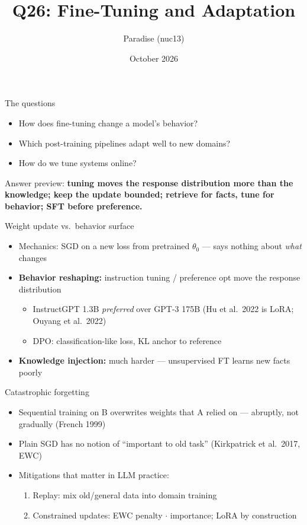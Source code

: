 \documentclass[aspectratio=169,11pt]{beamer}
\title{Q26: Fine-Tuning and Adaptation}
\author{Paradise (nuc13)}
\date{October 2026}
\begin{document}
\frame{\titlepage}

\begin{frame}{The questions}
\begin{itemize}
\item How does fine-tuning change a model's behavior?
\item Which post-training pipelines adapt well to new domains?
\item How do we tune systems online?
\end{itemize}
\vspace{1em}
Answer preview: \textbf{tuning moves the response distribution more than the knowledge; keep the update bounded; retrieve for facts, tune for behavior; SFT before preference.}
\end{frame}

\begin{frame}{Weight update vs.\ behavior surface}
\begin{itemize}
\item Mechanics: SGD on a new loss from pretrained $\theta_0$ --- says nothing about \emph{what} changes
\item \textbf{Behavior reshaping:} instruction tuning / preference opt move the response distribution
  \begin{itemize}
  \item InstructGPT 1.3B \emph{preferred} over GPT-3 175B (Hu et al.\ 2022 is LoRA; Ouyang et al.\ 2022)
  \item DPO: classification-like loss, KL anchor to reference
  \end{itemize}
\item \textbf{Knowledge injection:} much harder --- unsupervised FT learns new facts poorly
\end{itemize}
\end{frame}

\begin{frame}{Catastrophic forgetting}
\begin{itemize}
\item Sequential training on B overwrites weights that A relied on --- abruptly, not gradually (French 1999)
\item Plain SGD has no notion of ``important to old task'' (Kirkpatrick et al.\ 2017, EWC)
\item Mitigations that matter in LLM practice:
  \begin{enumerate}
  \item Replay: mix old/general data into domain training
  \item Constrained updates: EWC penalty $\cdot$ importance; LoRA by construction
  \end{enumerate}
\end{itemize}
\end{frame}
\end{document}
